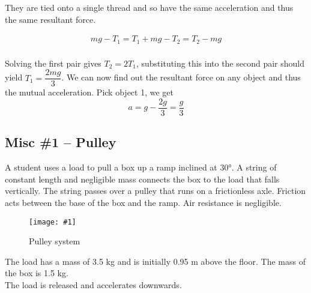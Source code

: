 \documentclass[a4paper,12pt]{article}
\newcommand{\lb}{\\[8pt]}
\newcommand{\img}[4]{\begin{center}
  \begin{figure}[H]
    \centering
    \texttt{[image: \#1]}
    \caption{#3}
    \label{fig:#4}
  \end{figure}
\end{center}}
\begin{document}
They are tied onto a single thread and so have the same acceleration and thus the same resultant force.

\begin{align*}
  mg - T_1 = T_1 + mg - T_2 = T_2 - mg \\
\end{align*}

Solving the first pair gives $T_2 = 2T_1$, substituting this into the second pair should yield $T_1 = \dfrac{2mg}{3}$. We can now find out the resultant force on any object and thus the mutual acceleration. Pick object 1, we get $$a = g - \frac{2g}{3} = \frac{g}{3}$$


\subsection{Misc \#1 -- Pulley}

A student uses a load to pull a box up a ramp inclined at 30°. A string of constant length and negligible mass connects the box to the load that falls vertically. The string passes over a pulley that runs on a frictionless axle. Friction acts between the base of the box and the ramp. Air resistance is negligible.

\img{ex/2.png}{0.7}{Pulley system}{pulley}

The load has a mass of 3.5 kg and is initially 0.95 m above the floor. The mass of the box is 1.5 kg.\lb
The load is released and accelerates downwards.
\end{document}
